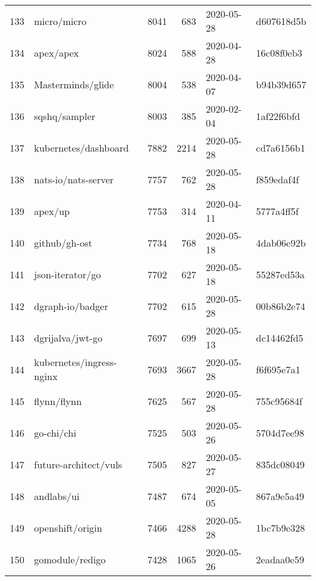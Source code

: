 \begin{longtable}{llrrll}
    133 &                                        micro/micro &   8041 &    683 & 2020-05-28 &  d607618d5b \\
    134 &                                          apex/apex &   8024 &    588 & 2020-04-28 &  16c08f0eb3 \\
    135 &                                  Masterminds/glide &   8004 &    538 & 2020-04-07 &  b94b39d657 \\
    136 &                                      sqshq/sampler &   8003 &    385 & 2020-02-04 &  1af22f6bfd \\
    137 &                               kubernetes/dashboard &   7882 &   2214 & 2020-05-28 &  cd7a6156b1 \\
    138 &                                nats-io/nats-server &   7757 &    762 & 2020-05-28 &  f859edaf4f \\
    139 &                                            apex/up &   7753 &    314 & 2020-04-11 &  5777a4ff5f \\
    140 &                                      github/gh-ost &   7734 &    768 & 2020-05-18 &  4dab06e92b \\
    141 &                                   json-iterator/go &   7702 &    627 & 2020-05-18 &  55287ed53a \\
    142 &                                   dgraph-io/badger &   7702 &    615 & 2020-05-28 &  00b86b2e74 \\
    143 &                                   dgrijalva/jwt-go &   7697 &    699 & 2020-05-13 &  dc14462fd5 \\
    144 &                           kubernetes/ingress-nginx &   7693 &   3667 & 2020-05-28 &  f6f695e7a1 \\
    145 &                                        flynn/flynn &   7625 &    567 & 2020-05-28 &  755c95684f \\
    146 &                                         go-chi/chi &   7525 &    503 & 2020-05-26 &  5704d7ee98 \\
    147 &                              future-architect/vuls &   7505 &    827 & 2020-05-27 &  835dc08049 \\
    148 &                                         andlabs/ui &   7487 &    674 & 2020-05-05 &  867a9e5a49 \\
    149 &                                   openshift/origin &   7466 &   4288 & 2020-05-28 &  1bc7b9e328 \\
    150 &                                    gomodule/redigo &   7428 &   1065 & 2020-05-26 &  2eadaa0e59 \\

\end{longtable}
